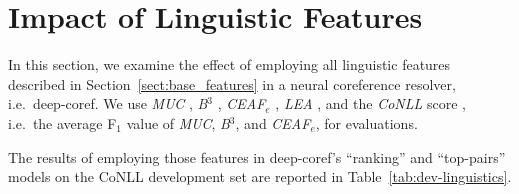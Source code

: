 \section{Impact of Linguistic Features}
\label{sect:all}
In this section, we examine the effect of employing all linguistic features described in Section~\ref{sect:base_features} in a neural coreference resolver, i.e.\ deep-coref.
We use \emph{MUC} \cite{vilain95}, \emph{B}$^3$ \cite{bagga98b},
\emph{CEAF}$_e$ \cite{luoxiaoqiang05a}, \emph{LEA} \cite{moosavi16b},
and the \emph{CoNLL} score \cite{pradhan14}, i.e.\ the average F$_1$ value of \emph{MUC}, \emph{B}$^3$, and \emph{CEAF}$_e$, for evaluations.

The results of employing those features in deep-coref's ``ranking'' and ``top-pairs'' models on the CoNLL development set are reported in Table~\ref{tab:dev-linguistics}.

